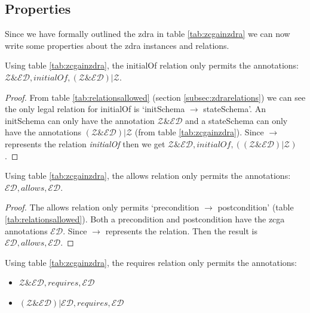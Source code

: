 \subsection{Properties}

Since we have formally outlined the \gls{zdra} in table \ref{tab:zcgainzdra} we can now write some properties about the \gls{zdra} instances and relations.

\begin{thm}
Using table \ref{tab:zcgainzdra}, the initialOf relation only permits the annotations: \\
 $\mathcal{Z} \& \mathcal{ED}, initialOf, (\mathcal{Z} \& \mathcal{ED}) | \mathcal{Z}$.
\end{thm}

\begin{proof}
From table \ref{tab:relationsallowed} (section \ref{subsec:zdrarelations}) we can see the only legal relation for initialOf is `initSchema $\longrightarrow$ stateSchema'. An initSchema can only have the annotation $\mathcal{Z} \& \mathcal{ED}$ and a stateSchema can only have the annotations $(\mathcal{Z} \& \mathcal{ED}) | \mathcal{Z}$ (from table \ref{tab:zcgainzdra}). Since $\longrightarrow$ represents the relation \emph{initialOf} then we get $\mathcal{Z} \& \mathcal{ED}, initialOf, ((\mathcal{Z} \& \mathcal{ED}) | \mathcal{Z})$.
\end{proof}

\begin{thm}
Using table \ref{tab:zcgainzdra}, the allows relation only permits the annotations: \\
$\mathcal{ED}, allows, \mathcal{ED}$.
\end{thm}

\begin{proof}
The allows relation only permits `precondition $\longrightarrow$ postcondition' (table \ref{tab:relationsallowed}). Both a precondition and postcondition have the \gls{zcga} annotations $\mathcal{ED}$. Since $\longrightarrow$ represents the relation. Then the result is $\mathcal{ED}, allows, \mathcal{ED}$.
\end{proof}

\begin{thm}
Using table \ref{tab:zcgainzdra}, the requires relation only permits the annotations:
\begin{itemize}
\item $\mathcal{Z} \& \mathcal{ED}, requires, \mathcal{ED}$
\item $(\mathcal{Z} \& \mathcal{ED}) | \mathcal{ED}, requires, \mathcal{ED}$
\end{itemize}
\end{thm}

